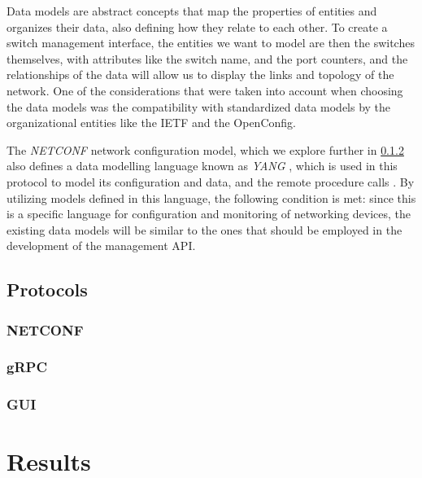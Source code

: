 Data models are abstract concepts that map the properties of entities and organizes their data, also defining how they relate to each other. To create a switch management interface, the entities we want to model are then 
the switches themselves, with attributes like the switch name, and the port counters, and the relationships of the data will allow us to display the links and topology of the network. One of the considerations that were taken into 
account when choosing the data models was the compatibility with standardized data models by the organizational entities like the IETF and the OpenConfig. 
\par The \textit{ NETCONF } network configuration model, which we explore further in \ref{ssec:grpc} also defines a data modelling language known as \textit{ YANG }, which is used in this protocol to model its configuration and data,
and the remote procedure calls \cite { CITE - rfc 6020 }. By utilizing models defined in this language, the following condition is met: since this is a specific language for configuration and monitoring of networking 
devices, the existing data models will be similar to the ones that should be employed in the development of the management API.



\subsection {Protocols}

\subsubsection {NETCONF}
\subsubsection {gRPC} \label {ssec:grpc}
\subsubsection {GUI}

\section {Results}
